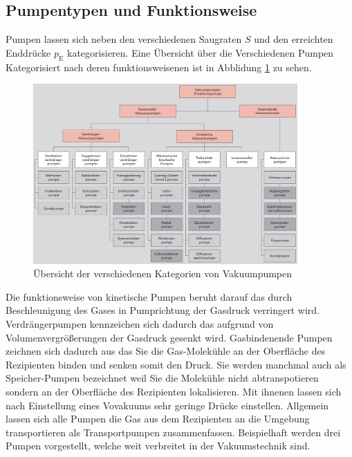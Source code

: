 \subsection{Pumpentypen und Funktionsweise}
Pumpen lassen sich neben den verschiedenen Saugraten $S$ und den erreichten Enddrücke $p_\text{E}$ kategorisieren. Eine Übersicht über die Verschiedenen Pumpen Kategorisiert nach deren funktionsweisenen ist in Abblidung \ref{fig:Uebersicht} zu sehen.
\begin{figure}[htbp]
  \centering
  \includegraphics[width=0.9\textwidth]{picture/Uebersicht.png}
  \caption{Übersicht der verschiedenen Kategorien von Vakuumpumpen \cite{Uebersicht}}
  \label{fig:Uebersicht}
\end{figure}
Die funktionsweise von kinetische Pumpen beruht darauf das durch Beschleunigung des Gases in Pumprichtung der Gasdruck verringert wird.
Verdrängerpumpen kennzeichen sich dadurch das aufgrund von Volumenvergrößerungen der Gasdruck gesenkt wird.
Gasbindenende Pumpen zeichnen sich dadurch aus das Sie die Gas-Molekühle an der Oberfläche des Rezipienten binden und senken somit den Druck. Sie werden manchmal auch als Speicher-Pumpen bezeichnet weil Sie die Molekühle nicht abtranspotieren sondern an der Oberfläche des Rezipienten lokalisieren. Mit ihnenen lassen sich nach Einstellung eines Vovakuums sehr geringe Drücke einstellen.
Allgemein lassen sich alle Pumpen die Gas aus dem Rezipienten an die Umgebung transportieren als Transportpumpen zusammenfassen. 
Beispielhaft werden drei Pumpen vorgestellt, welche weit verbreitet in der Vakuumstechnik sind. 
